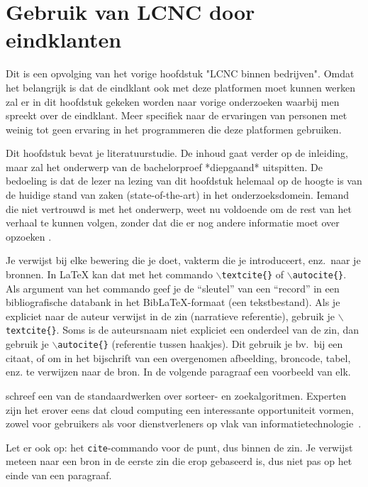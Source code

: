 \section{Gebruik van LCNC door eindklanten}
\label{sec:lcnc-eindklanten}
Dit is een opvolging van het vorige hoofdstuk "LCNC binnen bedrijven". Omdat het belangrijk is dat de eindklant ook met deze platformen moet kunnen werken
zal er in dit hoofdstuk gekeken worden naar vorige onderzoeken waarbij men spreekt over de eindklant. 
Meer specifiek naar de ervaringen van personen met weinig tot geen ervaring in het programmeren die deze platformen gebruiken.




Dit hoofdstuk bevat je literatuurstudie. De inhoud gaat verder op de inleiding, maar zal het onderwerp van de bachelorproef *diepgaand* uitspitten. De bedoeling is dat de lezer na lezing van dit hoofdstuk helemaal op de hoogte is van de huidige stand van zaken (state-of-the-art) in het onderzoeksdomein. Iemand die niet vertrouwd is met het onderwerp, weet nu voldoende om de rest van het verhaal te kunnen volgen, zonder dat die er nog andere informatie moet over opzoeken \autocite{Pollefliet2011}.

Je verwijst bij elke bewering die je doet, vakterm die je introduceert, enz.\ naar je bronnen. In \LaTeX{} kan dat met het commando \texttt{$\backslash${textcite\{\}}} of \texttt{$\backslash${autocite\{\}}}. Als argument van het commando geef je de ``sleutel'' van een ``record'' in een bibliografische databank in het Bib\LaTeX{}-formaat (een tekstbestand). Als je expliciet naar de auteur verwijst in de zin (narratieve referentie), gebruik je \texttt{$\backslash${}textcite\{\}}. Soms is de auteursnaam niet expliciet een onderdeel van de zin, dan gebruik je \texttt{$\backslash${}autocite\{\}} (referentie tussen haakjes). Dit gebruik je bv.~bij een citaat, of om in het bijschrift van een overgenomen afbeelding, broncode, tabel, enz. te verwijzen naar de bron. In de volgende paragraaf een voorbeeld van elk.

\textcite{Knuth1998} schreef een van de standaardwerken over sorteer- en zoekalgoritmen. Experten zijn het erover eens dat cloud computing een interessante opportuniteit vormen, zowel voor gebruikers als voor dienstverleners op vlak van informatietechnologie~\autocite{Creeger2009}.

Let er ook op: het \texttt{cite}-commando voor de punt, dus binnen de zin. Je verwijst meteen naar een bron in de eerste zin die erop gebaseerd is, dus niet pas op het einde van een paragraaf.

\lipsum[7-20]
